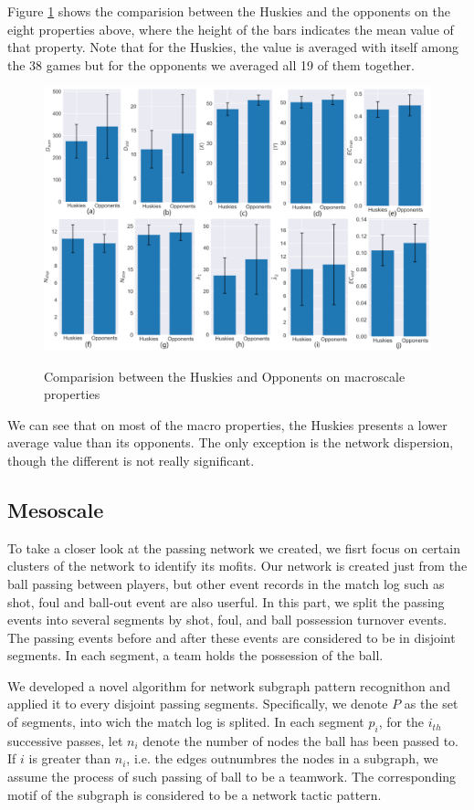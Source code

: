 \documentclass{mcmthesis}
\begin{document}
Figure \ref{macro} shows the comparision between the Huskies and the opponents on the eight properties above, where the height of the bars indicates the mean value of that property. Note that for the Huskies, the value is averaged with itself among the 38 games but for the opponents we averaged all 19 of them together.
\begin{figure}[htbp]
  \centering
  \caption{Comparision between the Huskies and Opponents on macroscale properties}
  \includegraphics[width=15cm]{macro.png}
  \label{macro}
\end{figure}

We can see that on most of the macro properties, the Huskies presents a lower average value than its opponents. The only exception is the network dispersion, though the different is not really significant.

\subsection{Mesoscale}

To take a closer look at the passing network we created, we fisrt focus on certain clusters of the network to identify its mofits.  Our network is created just from the ball passing between players, but other event records in the match log such as shot, foul and ball-out event  are also userful. In this part, we split the passing events into several segments by shot, foul, and ball possession turnover events. The passing events before and after these events are considered to be in disjoint segments. In each segment, a team holds the possession of the ball. 

We developed a novel algorithm for network subgraph pattern recognithon and applied it to every disjoint passing segments. Specifically, we denote $P$ as the set of segments, into wich the match log is splited. In each segment $p_i$, for the $i_{th}$ successive passes, let $n_i$ denote the number of nodes the ball has been passed to. If $i$ is greater than $n_i$, i.e. the edges outnumbres the nodes in a subgraph, we assume the process of such passing of ball to be a teamwork. The corresponding motif of the subgraph is considered to be a network tactic pattern.
\end{document}

